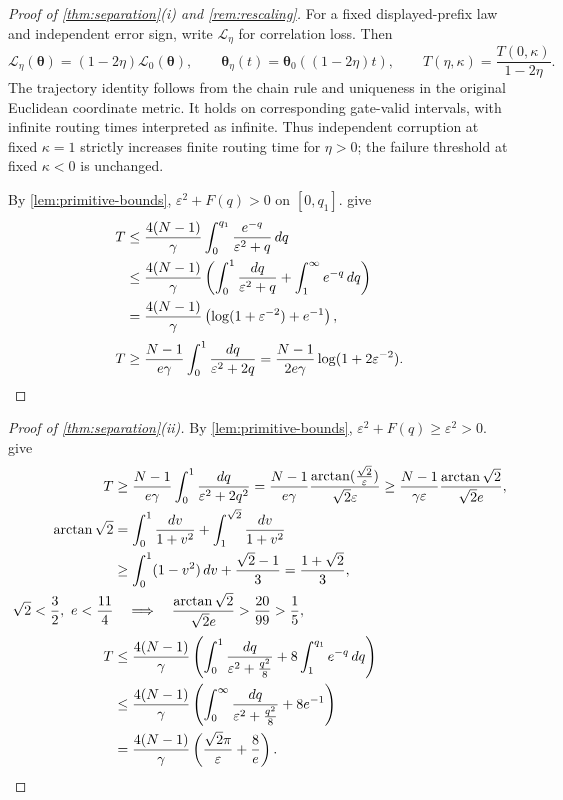 \begin{proof}[Proof of \cref{thm:separation}(i) and \cref{rem:rescaling}]
For a fixed displayed-prefix law and independent error sign, write $\mathcal L_\eta$ for correlation loss. Then
\[
 \mathcal L_\eta(\bm\theta)=(1-2\eta)\mathcal L_0(\bm\theta),\qquad
 \bm\theta_\eta(t)=\bm\theta_0((1-2\eta)t),\qquad
 T(\eta,\kappa)=\frac{T(0,\kappa)}{1-2\eta}.
\]
The trajectory identity follows from the chain rule and uniqueness in the original Euclidean coordinate metric.
It holds on corresponding gate-valid intervals, with infinite routing times interpreted as infinite.
Thus independent corruption at fixed $\kappa=1$ strictly increases finite routing time for $\eta>0$;
the failure threshold at fixed $\kappa<0$ is unchanged.

By \cref{lem:primitive-bounds}, $\varepsilon^2+F(q)>0$ on $[0,q_1]$.
 give
\begin{align*}
 T
 &\le\frac{4(N-1)}{\gamma}\int_0^{q_1}\frac{e^{-q}}{\varepsilon^2+q}\,dq\\
 &\le\frac{4(N-1)}{\gamma}
 \left(\int_0^1\frac{dq}{\varepsilon^2+q}+\int_1^\infty e^{-q}\,dq\right)\\
 &=\frac{4(N-1)}{\gamma}\left(\log(1+\varepsilon^{-2})+e^{-1}\right),\\[2pt]
 T
 &\ge\frac{N-1}{e\gamma}\int_0^1\frac{dq}{\varepsilon^2+2q}
 =\frac{N-1}{2e\gamma}\log(1+2\varepsilon^{-2}).\qedhere
\end{align*}
\end{proof}

\begin{proof}[Proof of \cref{thm:separation}(ii)]
By \cref{lem:primitive-bounds}, $\varepsilon^2+F(q)\ge \varepsilon^2>0$.
 give
\begin{align*}
 T
 &\ge\frac{N-1}{e\gamma}\int_0^1\frac{dq}{\varepsilon^2+2q^2}
 =\frac{N-1}{e\gamma}\frac{\arctan(\frac{\sqrt2}{\varepsilon})}{\sqrt2\varepsilon}
 \ge\frac{N-1}{\gamma \varepsilon}\frac{\arctan\sqrt2}{\sqrt2e},\\
 \arctan\sqrt2
 &=\int_0^1\frac{dv}{1+v^2}+\int_1^{\sqrt2}\frac{dv}{1+v^2}\\
 &\ge\int_0^1(1-v^2)\,dv+\frac{\sqrt2-1}{3}=\frac{1+\sqrt2}{3},\\
 \sqrt2<\frac{3}{2},\ e<\frac{11}{4}
 &\quad\Longrightarrow\quad
 \frac{\arctan\sqrt2}{\sqrt2e}>\frac{20}{99}>\frac{1}{5},\\[2pt]
 T
 &\le\frac{4(N-1)}{\gamma}
 \left(\int_0^1\frac{dq}{\varepsilon^2+\frac{q^2}{8}}+8\int_1^{q_1}e^{-q}\,dq\right)\\
 &\le\frac{4(N-1)}{\gamma}
 \left(\int_0^\infty\frac{dq}{\varepsilon^2+\frac{q^2}{8}}+8e^{-1}\right)\\
 &=\frac{4(N-1)}{\gamma}
 \left(\frac{\sqrt2\pi}{\varepsilon}+\frac{8}{e}\right).\qedhere
\end{align*}
\end{proof}

